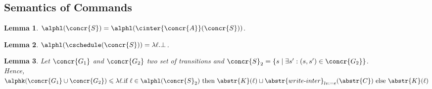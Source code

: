 \documentclass[12pt]{article}
\let\firstunion\cup
\let\savesqcup\sqcup
\let\cup\firstunion
\let\sqcup\savesqcup
\newcommand{\iaecr}[1]{\abstr{write\text{-}inter}_{#1}}
\newcommand{\iaecra}[2]{\iaecr{#1}(#2)}
\newcommand{\fleche}{\mapsto}
\newcommand{\func}[2]{\lambda #1. #2 } \newcommand{\fx}[3]{#1[#2 \fleche #3]} \newcommand{\nf}[3]{#1\smallsetminus[#2 \fleche #3]}  \newcommand{\ndf}[2]{#1(#2)\uparrow}
\newtheorem{lemma}{Lemma}
\begin{document}
\subsection{Semantics of Commands}

\figbasicabstractsem

\begin{lemma}\label{lemma:L}
 \(\alphl(\concr{S})=\alphl(\cinter{\concr{A}}(\concr{S}))\).
\end{lemma}

\begin{lemma}
 \label{lemma:LL}
  \(\alphl(\cschedule(\concr{S}))=\func{\ell}{\bot}\).
\end{lemma}


\begin{lemma}\label{lemma:Kunion}
 Let \(\concr{G_1}\) and \(\concr{G_2}\) two set of transitions and \(\concr{S}_2=\{s\mid \exists s': (s,s')\in\concr{G_2}\}\).\\
Hence, \(\alphk(\concr{G_1}\cup\concr{G_2})\leqslant\func{\ell}{\text{if } \ell\in\alphl(\concr{S}_2) 
\text{ then } \abstr{K}(\ell)\sqcup \iaecra{lv:=e}{\abstr{C}} \text{ else } \abstr{K}(\ell)    }\)
\end{lemma}
\end{document}
